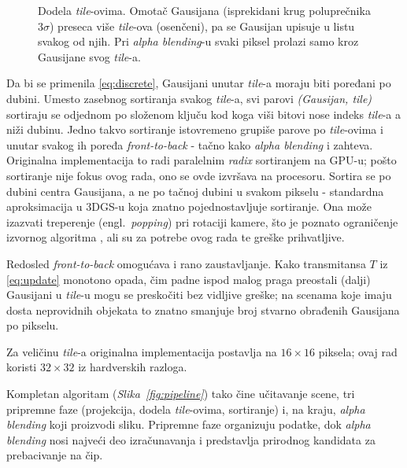 \documentclass[12pt]{article}
\begin{document}
   \begin{figure}[H]
      \centering
      \caption{Dodela \textit{tile}-ovima. Omotač Gausijana (isprekidani krug
      poluprečnika $3\sigma$) preseca više \textit{tile}-ova (osenčeni), pa se
      Gausijan upisuje u listu svakog od njih. Pri \textit{alpha blending}-u svaki
      piksel prolazi samo kroz Gausijane svog \textit{tile}-a.}
      \label{fig:tiling}
   \end{figure}

   Da bi se primenila \eqref{eq:discrete}, Gausijani unutar \textit{tile}-a moraju
   biti poređani po dubini. Umesto zasebnog sortiranja svakog \textit{tile}-a, svi
   parovi \textit{(Gausijan, tile)} sortiraju se odjednom po složenom ključu kod koga
   viši bitovi nose indeks \textit{tile}-a a niži dubinu. Jedno takvo
   sortiranje istovremeno grupiše parove po \textit{tile}-ovima i unutar svakog ih
   poređa \textit{front-to-back} - tačno kako \textit{alpha blending} i zahteva. Originalna
   implementacija to radi paralelnim \textit{radix} sortiranjem na GPU-u; pošto
   sortiranje nije fokus ovog rada, ono se ovde izvršava na procesoru.
   Sortira se po dubini centra Gausijana, a ne po tačnoj dubini u svakom pikselu -
   standardna aproksimacija u 3DGS-u koja znatno pojednostavljuje sortiranje. Ona može
   izazvati treperenje (engl.\ \textit{popping}) pri rotaciji kamere, što je poznato
   ograničenje izvornog algoritma \cite{stopthepop}, ali su za potrebe ovog rada te
   greške prihvatljive.

   \newpage

   Redosled \textit{front-to-back} omogućava i rano zaustavljanje. Kako transmitansa
   $T$ iz \eqref{eq:update} monotono opada, čim padne ispod malog praga preostali
   (dalji) Gausijani u \textit{tile}-u mogu se preskočiti bez vidljive greške; na
   scenama koje imaju dosta neprovidnih objekata to znatno smanjuje broj stvarno obrađenih Gausijana po pikselu.

   Za veličinu \textit{tile}-a originalna implementacija postavlja na $16 \times 16$
   piksela; ovaj rad koristi $32 \times 32$ iz hardverskih razloga.

   Kompletan algoritam (\textit{Slika~\ref{fig:pipeline}}) tako čine učitavanje scene,
   tri pripremne faze (projekcija, dodela \textit{tile}-ovima, sortiranje) i, na kraju,
   \textit{alpha blending} koji proizvodi sliku. Pripremne faze organizuju podatke, dok
   \textit{alpha blending} nosi najveći deo izračunavanja i predstavlja prirodnog kandidata za prebacivanje
   na čip.

   \newpage
   \printbibliography[title={Literatura}]
\end{document}
